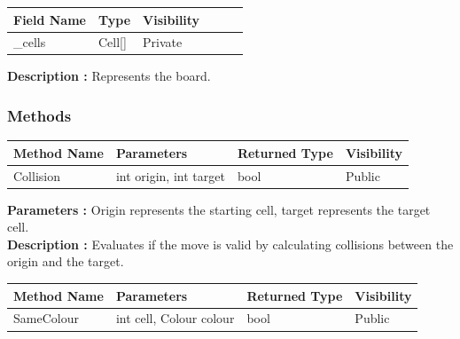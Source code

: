 \documentclass[12pt]{article}
\begin{document}
    \begin{table}[H]
        \begin{tabular}{llllll}
            \hline
            \multicolumn{1}{|l|}{\cellcolor[HTML]{EFEFEF}\textbf{Field Name}} & \multicolumn{1}{l|}{\cellcolor[HTML]{EFEFEF}\textbf{Type}} & \multicolumn{1}{l|}{\cellcolor[HTML]{EFEFEF}\textbf{Visibility}} \\ \hline
            \multicolumn{1}{|l|}{\_cells}                                     & \multicolumn{1}{l|}{Cell[]}                                & \multicolumn{1}{l|}{Private}                                     \\ \hline
        \end{tabular}
    \end{table}

    \textbf{Description :}  Represents the board.

    \subsubsection{Methods}

    \begin{table}[H]
        \begin{tabular}{|l|l|l|l|}
            \hline
            \rowcolor[HTML]{EFEFEF}
            \cellcolor[HTML]{EFEFEF}\textbf{Method Name} & \textbf{Parameters}    & \textbf{Returned Type} & \textbf{Visibility} \\ \hline
            Collision                                    & int origin, int target & bool                   & Public              \\ \hline
        \end{tabular}
    \end{table}

    \textbf{Parameters :} Origin represents the starting cell, target represents the target cell.
    \\

    \textbf{Description :} Evaluates if the move is valid by calculating collisions between the origin and the target.

    \begin{table}[H]
        \begin{tabular}{|l|l|l|l|}
            \hline
            \rowcolor[HTML]{EFEFEF}
            \cellcolor[HTML]{EFEFEF}\textbf{Method Name} & \textbf{Parameters}     & \textbf{Returned Type} & \textbf{Visibility} \\ \hline
            SameColour                                   & int cell, Colour colour & bool                   & Public              \\ \hline
        \end{tabular}
    \end{table}
\end{document}

